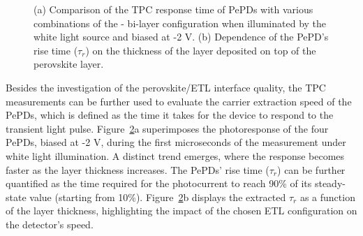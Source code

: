 \begin{figure}[ht!]
\begin{subfigure}[t]{0.37\textwidth}
        \caption{}
        \label{}
    \end{subfigure} 
 
    \caption{(a) Comparison of the TPC response time of PePDs with various combinations of the - bi-layer configuration when illuminated by the white light source and biased at -2 V. (b) Dependence of the PePD's rise time ($\tau_r$) on the thickness of the  layer deposited on top of the perovskite layer.}
    \label{fig:etl_opt:rise_time}
\end{figure}

Besides the investigation of the perovskite/ETL interface quality, the TPC measurements can be further used to evaluate the carrier extraction speed of the PePDs, which is defined as the time it takes for the device to respond to the transient light pulse. Figure~\ref{fig:etl_opt:rise_time}a superimposes the photoresponse of the four PePDs, biased at -2 V, during the first microseconds of the measurement under white light illumination. A distinct trend emerges, where the response becomes faster as the  layer thickness increases. The PePDs' rise time ($\tau_r$) can be further quantified as the time required for the photocurrent to reach 90\% of its steady-state value (starting from 10\%). Figure~\ref{fig:etl_opt:rise_time}b displays the extracted $\tau_r$ as a function of the  layer thickness, highlighting the impact of the chosen ETL configuration on the detector's speed.  

